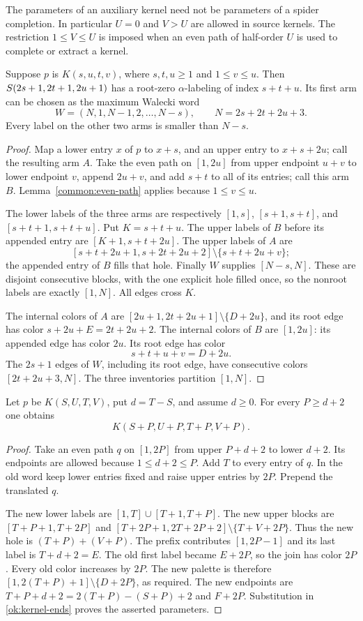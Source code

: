 The parameters of an auxiliary kernel need not be parameters of a
spider completion. In particular $U=0$ and $V>U$ are allowed in
source kernels. The restriction $1\le V\le U$ is imposed when an
even path of half-order $U$ is used to complete or extract a kernel.

\begin{lemma}\label{ok:completion}
Suppose $p$ is $K(s,u,t,v)$, where $s,t,u\ge1$ and $1\le v\le u$.
Then $S\!\left(2s+1,2t+1,2u+1\right)$ has a root-zero $\alpha$-labeling of
index $s+t+u$. Its first arm can be chosen as the maximum Walecki word
\[
 W=(N,1,N-1,2,\ldots,N-s),\qquad N=2s+2t+2u+3.
\]
Every label on the other two arms is smaller than $N-s$.
\end{lemma}
\begin{proof}
Map a lower entry $x$ of $p$ to $x+s$, and an upper entry to
$x+s+2u$; call the resulting arm $A$. Take the even path on
$[1,2u]$ from upper endpoint $u+v$ to lower endpoint $v$, append
$2u+v$, and add $s+t$ to all of its entries; call this arm $B$.
Lemma~\ref{common:even-path} applies because $1\le v\le u$.

The lower labels of the three arms are respectively
$[1,s]$, $[s+1,s+t]$, and $[s+t+1,s+t+u]$. Put $K=s+t+u$.
The upper labels of $B$ before its appended entry are
$[K+1,s+t+2u]$. The upper labels of $A$ are
\[
 [s+t+2u+1,s+2t+2u+2]\setminus\{s+t+2u+v\};
 \]
the appended entry of $B$ fills that hole. Finally $W$ supplies
$[N-s,N]$. These are disjoint consecutive blocks, with the one
explicit hole filled once, so the nonroot labels are exactly $[1,N]$.
All edges cross $K$.

The internal colors of $A$ are
$[2u+1,2t+2u+1]\setminus\{D+2u\}$, and its root edge has color
$s+2u+E=2t+2u+2$. The internal colors of $B$ are $[1,2u]$:
its appended edge has color $2u$. Its root edge has color
\[
 s+t+u+v=D+2u.
 \]
The $2s+1$ edges of $W$, including its root edge, have consecutive
colors $[2t+2u+3,N]$. The three inventories partition $[1,N]$.
\end{proof}

\begin{lemma}\label{ok:diagonal-growth}
Let $p$ be $K(S,U,T,V)$, put $d=T-S$, and assume $d\ge0$.
For every $P\ge d+2$ one obtains
\[
 K(S+P,U+P,T+P,V+P).
\]
\end{lemma}
\begin{proof}
Take an even path $q$ on $[1,2P]$ from upper $P+d+2$ to lower
$d+2$. Its endpoints are allowed because $1\le d+2\le P$.
Add $T$ to every entry of $q$. In the old word keep lower entries
fixed and raise upper entries by $2P$. Prepend the translated $q$.

The new lower labels are $[1,T]\cup[T+1,T+P]$.
The new upper blocks are $[T+P+1,T+2P]$ and
$[T+2P+1,2T+2P+2]\setminus\{T+V+2P\}$.
Thus the new hole is $(T+P)+(V+P)$. The prefix contributes
$[1,2P-1]$ and its last label is $T+d+2=E$.
The old first label became $E+2P$, so the join has color $2P$.
Every old color increases by $2P$. The new palette is therefore
$[1,2(T+P)+1]\setminus\{D+2P\}$, as required.
The new endpoints are
$T+P+d+2=2(T+P)-(S+P)+2$ and $F+2P$.
Substitution in \eqref{ok:kernel-ends} proves the asserted parameters.
\end{proof}

